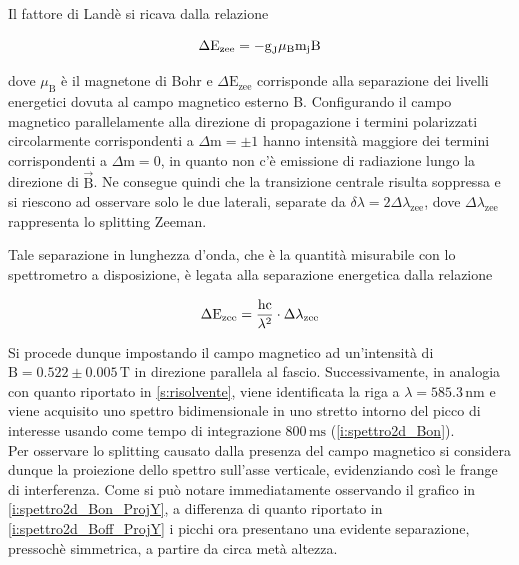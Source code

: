 \documentclass[twocolumn,10pt]{asme2ej}
\begin{document}
Il fattore di Landè si ricava dalla relazione

\vspace{-15pt}
\begin{equation}
    \Delta \text{E}_{\text{zee}} = - \text{g}_{\text{J}} \mu_{\text{B}} \text{m}_{\text{j}} \text{B} 
    \label{e:gL}
\vspace{-5pt}
\end{equation}

dove $\mu_{\text{B}}$ è il magnetone di Bohr e $\Delta \text{E}_{\text{zee}}$ corrisponde alla separazione dei livelli
energetici dovuta al campo magnetico esterno B. Configurando il campo magnetico parallelamente alla direzione di
propagazione i termini polarizzati circolarmente corrispondenti a $\Delta \text{m} = \pm 1$ hanno intensità maggiore dei
termini corrispondenti a $\Delta \text{m} = 0$, in quanto non c'è emissione di radiazione lungo la direzione di $\vec{\text{B}}$.
Ne consegue quindi che la transizione centrale risulta soppressa e si
riescono ad osservare solo le due laterali, separate da $\delta\lambda = 2 \Delta\lambda_{\text{zee}}$, dove
$\Delta\lambda_{\text{zee}}$ rappresenta lo splitting Zeeman. 


\noindent Tale separazione in lunghezza d'onda, che è la quantità misurabile con lo spettrometro a disposizione, è legata alla
separazione energetica dalla relazione

\vspace{-15pt}
\begin{equation}
    \Delta \text{E}_{\text{zee}} = \frac{\text{hc}}{\lambda^2} \cdot \Delta\lambda_{\text{zee}}
    \label{e:dEzee}
\vspace{-5pt}
\end{equation}

Si procede dunque impostando il campo magnetico ad un'intensità di $\text{B} = 0.522 \pm 0.005 \,\si{\tesla}$ in
direzione parallela al fascio. Successivamente, in analogia con quanto riportato in \autoref{s:risolvente}, viene
identificata la riga a $\lambda = 585.3 \,\si{\nano\metre}$ e viene acquisito uno spettro bidimensionale in uno stretto
intorno del picco di interesse usando come tempo di integrazione $800\,\si{\milli\second}$ (\autoref{i:spettro2d_Bon}).
\\
Per osservare lo splitting causato dalla presenza del campo magnetico si considera dunque la proiezione dello spettro
sull'asse verticale, evidenziando così le frange di interferenza. Come si può notare immediatamente osservando il
grafico in \autoref{i:spettro2d_Bon_ProjY}, a differenza di quanto riportato in \autoref{i:spettro2d_Boff_ProjY} i
picchi ora presentano una evidente separazione, pressochè simmetrica, a partire da circa metà altezza. 
\end{document}
